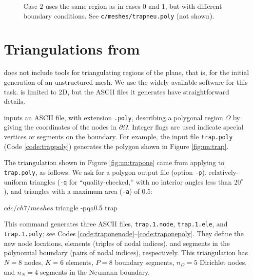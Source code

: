 \begin{figure}

\caption{Case $2$ uses the same region as in cases $0$ and $1$, but with different boundary conditions.  See \texttt{c/\CODELOC meshes/trapneu.poly} (not shown).}
\label{fig:un:trapneu}
\end{figure}


\section{Triangulations from \Triangle}

\PETSc does not include tools for triangulating regions of the plane, that is, for the initial generation of an unstructured mesh.  We use the widely-available \Triangle{} software \citep{Shewchuk1996} for this task.  \Triangle is limited to 2D, but the ASCII files it generates have straightforward details.


\Triangle inputs an ASCII file, with extension \texttt{.poly}, describing a polygonal region $\Omega$ by giving the coordinates of the nodes in $\partial \Omega$.  Integer flags are used indicate special vertices or segments on the boundary.  For example, the input file \texttt{trap.poly} (Code \ref{code:trappoly}) generates the polygon shown in Figure \ref{fig:un:trap}.

The triangulation shown in Figure \ref{fig:un:trapone} came from applying \Triangle to \texttt{trap.poly}, as follows.  We ask for a polygon output file (option \texttt{-p}), relatively-uniform triangles (\texttt{-q} for ``quality-checked,'' with no interior angles less than $20^\circ$ \citep{Shewchuk1996}), and triangles with a maximum area (\texttt{-a}) of $0.5$:
\begin{cline}
$ cd c/ch7/meshes
$ triangle -pqa0.5 trap
\end{cline}
This command generates three ASCII files, \texttt{trap.1.node}, \texttt{trap.1.ele}, and \texttt{trap.1.poly}; see Codes \ref{code:traponenode}--\ref{code:traponepoly}.  They define the new node locations, elements (triples of nodal indices), and segments in the polynomial boundary (pairs of nodal indices), respectively.  This triangulation has $N=8$ nodes, $K=6$ elements, $P=8$ boundary segments, $n_D=5$ Dirichlet nodes, and $n_N=4$ segments in the Neumann boundary.

